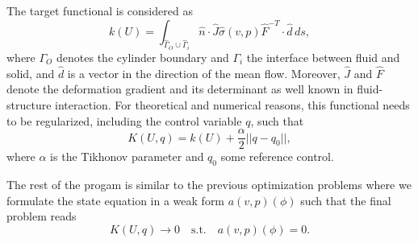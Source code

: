 The target functional is considered as 
\[
k(U) = \int_{\hat\Gamma_O \cup \hat\Gamma_i} \hat n\cdot \hat J\hat\sigma(v,p)\hat
F^{-T} \cdot \hat d \, ds,
\]
where $\Gamma_O$ denotes the cylinder boundary and $\Gamma_i$ the 
interface between fluid and solid, and $\hat d$ is a vector in the
direction
of the mean flow. Moreover, $\hat J$ and $\hat F$ denote the deformation 
gradient and its determinant as well known in fluid-structure interaction.
For theoretical and numerical reasons, this functional 
needs to be regularized, including the control variable $q$, such that
\[
K(U,q) = k(U) + \frac{\alpha}{2}||q - q_0||,
\] 
where $\alpha$ is the Tikhonov parameter and $q_0$ some 
reference control. 

The rest of the progam is similar to the previous optimization problems where
we formulate the state equation in a weak form $a(v,p)(\phi)$ such that the 
final problem reads
\[
K(U,q) \rightarrow 0 \quad \text{s.t.} \quad a(v,p)(\phi) = 0.
\]






